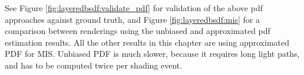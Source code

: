 

See Figure \ref{fig:layeredbsdf:validate_pdf} for validation of the above pdf approaches against ground truth, and Figure \ref{fig:layeredbsdf:mis} for a comparison between renderings using the unbiased and approximated pdf estimation results. 
All the other results in this chapter are using approximated PDF for MIS. Unbiased PDF is much slower, because it requires long light paths, and has to be computed twice per shading event.





